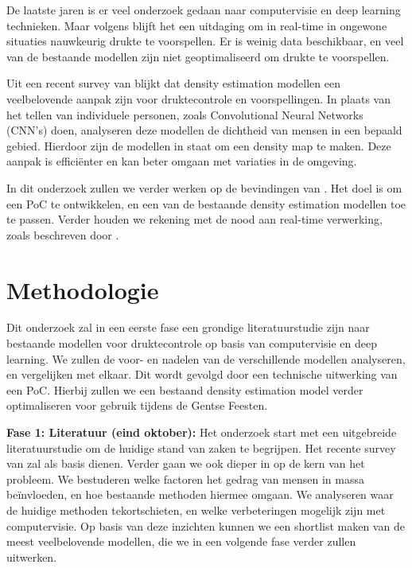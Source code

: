 De laatste jaren is er veel onderzoek gedaan naar computervisie en deep learning technieken. Maar volgens \textcite{Khan2020} blijft het een uitdaging om in real-time in ongewone situaties nauwkeurig drukte te voorspellen. Er is weinig data beschikbaar, en veel van de bestaande modellen zijn niet geoptimaliseerd om drukte te voorspellen.

Uit een recent survey van \textcite{Gao2025} blijkt dat density estimation modellen een veelbelovende aanpak zijn voor druktecontrole en voorspellingen. In plaats van het tellen van individuele personen, zoals Convolutional Neural Networks (CNN's) doen, analyseren deze modellen de dichtheid van mensen in een bepaald gebied. Hierdoor zijn de modellen in staat om een density map te maken. Deze aanpak is efficiënter en kan beter omgaan met variaties in de omgeving. 

In dit onderzoek zullen we verder werken op de bevindingen van \textcite{Gao2025}. Het doel is om een PoC te ontwikkelen, en een van de bestaande density estimation modellen toe te passen. Verder houden we rekening met de nood aan real-time verwerking, zoals beschreven door \textcite{Khan2020}.

\section{Methodologie}%
\label{sec:methodologie}

Dit onderzoek zal in een eerste fase een grondige literatuurstudie zijn naar bestaande modellen voor druktecontrole op basis van computervisie en deep learning. We zullen de voor- en nadelen van de verschillende modellen analyseren, en vergelijken met elkaar. Dit wordt gevolgd door een technische uitwerking van een PoC. Hierbij zullen we een bestaand density estimation model verder optimaliseren voor gebruik tijdens de Gentse Feesten.

\textbf{Fase 1: Literatuur (eind oktober): } Het onderzoek start met een uitgebreide literatuurstudie om de huidige stand van zaken te begrijpen. Het recente survey van \textcite{Gao2025} zal als basis dienen. Verder gaan we ook dieper in op de kern van het probleem. We bestuderen welke factoren het gedrag van mensen in massa beïnvloeden, en hoe bestaande methoden hiermee omgaan. We analyseren waar de huidige methoden tekortschieten, en welke verbeteringen mogelijk zijn met computervisie. Op basis van deze inzichten kunnen we een shortlist maken van de meest veelbelovende modellen, die we in een volgende fase verder zullen uitwerken.

